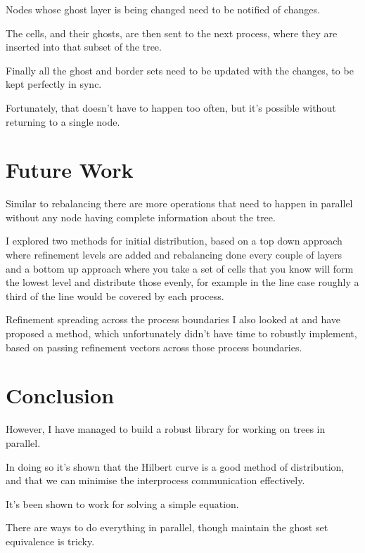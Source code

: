 \documentclass[10pt]{article}
\begin{document}
    	Nodes whose ghost layer is being changed need to be notified of changes.
    	
    	The cells, and their ghosts, are then sent to the next process, where they are inserted into that subset of the tree.
    	
    	Finally all the ghost and border sets need to be updated with the changes, to be kept perfectly in sync. 
    	
    	Fortunately, that doesn't have to happen too often, but it's possible without returning to a single node. 
    	
    	
    	
\section{Future Work}

	Similar to rebalancing there are more operations that need to happen in parallel without any node having complete information about the tree. 
	
	I explored two methods for initial distribution, based on a top down approach where refinement levels are added and rebalancing done every couple of layers and a bottom up approach where you take a set of cells that you know will form the lowest level and distribute those evenly, for example in the line case roughly a third of the line would be covered by each process. 
	
	Refinement spreading across the process boundaries I also looked at and have proposed a method, which unfortunately didn't have time to robustly implement, based on passing refinement vectors across those process boundaries. 

\section{Conclusion}
	However, I have managed to build a robust library for working on trees in parallel. 
	
	In doing so it's shown that the Hilbert curve is a good method of distribution, and that we can minimise the interprocess communication effectively. 
	
	It's been shown to work for solving a simple equation. 
	
	There are ways to do everything in parallel, though maintain the ghost set equivalence is tricky.
\end{document}
